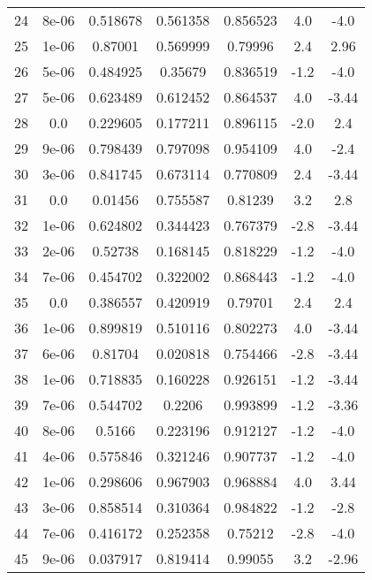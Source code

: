 \begin{table}
\begin{tabular}{c|c|c|c|c|c|c}
24 & 8e-06 & 0.518678 & 0.561358 & 0.856523 & 4.0 & -4.0\\
25 & 1e-06 & 0.87001 & 0.569999 & 0.79996 & 2.4 & 2.96\\
26 & 5e-06 & 0.484925 & 0.35679 & 0.836519 & -1.2 & -4.0\\
27 & 5e-06 & 0.623489 & 0.612452 & 0.864537 & 4.0 & -3.44\\
28 & 0.0 & 0.229605 & 0.177211 & 0.896115 & -2.0 & 2.4\\
29 & 9e-06 & 0.798439 & 0.797098 & 0.954109 & 4.0 & -2.4\\
30 & 3e-06 & 0.841745 & 0.673114 & 0.770809 & 2.4 & -3.44\\
31 & 0.0 & 0.01456 & 0.755587 & 0.81239 & 3.2 & 2.8\\
32 & 1e-06 & 0.624802 & 0.344423 & 0.767379 & -2.8 & -3.44\\
33 & 2e-06 & 0.52738 & 0.168145 & 0.818229 & -1.2 & -4.0\\
34 & 7e-06 & 0.454702 & 0.322002 & 0.868443 & -1.2 & -4.0\\
35 & 0.0 & 0.386557 & 0.420919 & 0.79701 & 2.4 & 2.4\\
36 & 1e-06 & 0.899819 & 0.510116 & 0.802273 & 4.0 & -3.44\\
37 & 6e-06 & 0.81704 & 0.020818 & 0.754466 & -2.8 & -3.44\\
38 & 1e-06 & 0.718835 & 0.160228 & 0.926151 & -1.2 & -3.44\\
39 & 7e-06 & 0.544702 & 0.2206 & 0.993899 & -1.2 & -3.36\\
40 & 8e-06 & 0.5166 & 0.223196 & 0.912127 & -1.2 & -4.0\\
41 & 4e-06 & 0.575846 & 0.321246 & 0.907737 & -1.2 & -4.0\\
42 & 1e-06 & 0.298606 & 0.967903 & 0.968884 & 4.0 & 3.44\\
43 & 3e-06 & 0.858514 & 0.310364 & 0.984822 & -1.2 & -2.8\\
44 & 7e-06 & 0.416172 & 0.252358 & 0.75212 & -2.8 & -4.0\\
45 & 9e-06 & 0.037917 & 0.819414 & 0.99055 & 3.2 & -2.96\\
\end{tabular}
\end{table}
\newpage
